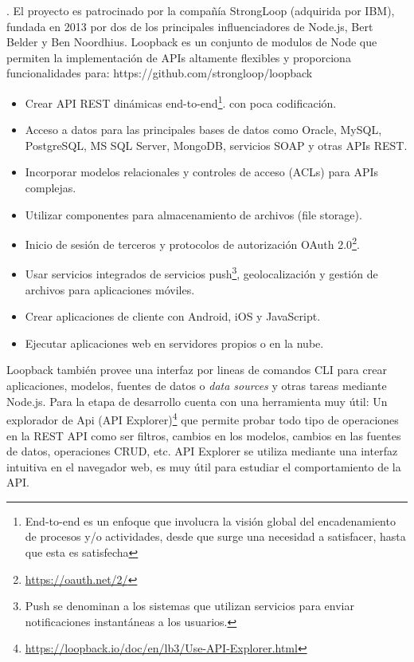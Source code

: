 \citep{Strongloop2018}. El proyecto es patrocinado por la compañía StrongLoop (adquirida por IBM), fundada en 2013 por dos de los principales influenciadores de Node.js, Bert Belder y Ben Noordhius. Loopback es un conjunto de modulos de Node que permiten la implementación de APIs altamente flexibles y proporciona funcionalidades para:
https://github.com/strongloop/loopback
\begin{itemize}
    \item Crear API REST dinámicas end-to-end\footnote{End-to-end es un enfoque que involucra la visión global del encadenamiento de procesos y/o actividades, desde que surge una necesidad a satisfacer, hasta que esta es satisfecha}. con poca codificación.
    \item Acceso a datos para las principales bases de datos como Oracle, MySQL, PostgreSQL, MS SQL Server, MongoDB, servicios SOAP y otras APIs REST.
    \item Incorporar modelos relacionales y controles de acceso (ACLs) para APIs complejas.
    \item Utilizar componentes para almacenamiento de archivos (file storage).
    \item Inicio de sesión de terceros y protocolos de autorización OAuth 2.0\footnote{\url{https://oauth.net/2/}}.
    \item Usar servicios integrados de servicios push\footnote{Push se denominan a los sistemas que utilizan servicios para enviar notificaciones instantáneas a los usuarios.}, geolocalización y gestión de archivos para aplicaciones móviles.
    \item Crear aplicaciones de cliente con Android, iOS y JavaScript.
    \item Ejecutar aplicaciones web en servidores propios o en la nube.
\end{itemize}

Loopback también provee una interfaz por lineas de comandos CLI  para crear aplicaciones, modelos, fuentes de datos o \textit{data sources} y otras tareas mediante Node.js. Para la etapa de desarrollo cuenta con una herramienta muy útil: Un explorador de Api (API Explorer)\footnote{\url{https://loopback.io/doc/en/lb3/Use-API-Explorer.html}} que permite probar todo tipo de operaciones en la REST API como ser filtros, cambios en los modelos, cambios en las fuentes de datos, operaciones CRUD, etc. API Explorer se utiliza mediante una interfaz intuitiva en el navegador web, es muy útil para estudiar el comportamiento de la API.

